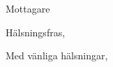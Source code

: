 \documentclass[a4paper]{letter}
\renewcommand{\ps}{P.S.~}
\begin{document}
\begin{letter}{Mottagare}

    \opening{Hälsningsfras,}

    \lipsum[1-2]

    \closing{Med vänliga hälsningar,}



\end{letter}
\end{document}
